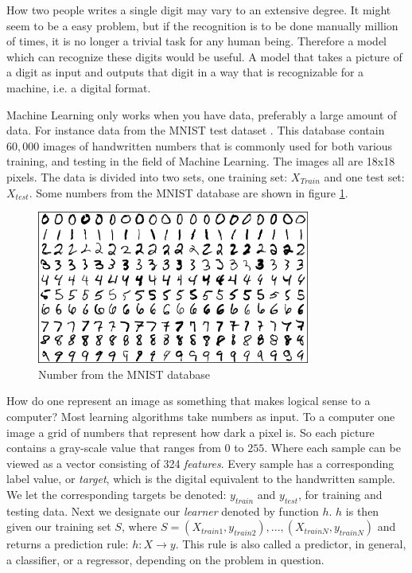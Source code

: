 	How two people writes a single digit may vary to an extensive degree. It might seem to be a easy problem, but if the recognition is to be done manually million of times, it is no longer a trivial task for any human being. Therefore a model which can recognize these digits would be useful. A model that takes a picture of a digit as input and outputs that digit in a way that is recognizable for a machine, i.e. a digital format.
	
	Machine Learning only works when you have data, preferably a large amount of data. For instance data from the MNIST test dataset \cite{lecun1998gradient}. This database contain $60,000$ images of handwritten numbers that is commonly used for both various training, and testing in the field of Machine Learning. The images all are 18x18 pixels. The data is divided into two sets, one training set: $X_{Train}$ and one test set: $X_{test}$. Some numbers from the MNIST database are shown in figure \ref{fig:MNIST}. 
	
\begin{figure}[ht]
    \centering
    \includegraphics[width=0.8\textwidth]{theory/figures/MNIST.png}
    \caption{Number from the MNIST database \cite{MNIST}}
    \label{fig:MNIST}
\end{figure}
	
	How do one represent an image as something that makes logical sense to a computer? Most learning algorithms take numbers as input. To a computer one image a grid of numbers that represent how dark a pixel is. So each picture contains a gray-scale value that ranges from $0$ to $255$. Where each sample can be viewed as a vector consisting of 324 \textit{features}. Every sample has a corresponding label value, or \textit{target}, which is the digital equivalent to the handwritten sample. We let the corresponding targets be denoted: $y_{train}$ and $y_{test}$, for training and testing data. Next we designate our \textit{learner} denoted by function $h$. $h$ is then given our training set $S$, where $S = (X_{train1}, y_{train2}),..., (X_{trainN}, y_{trainN})$ and returns a prediction rule: $h: X \rightarrow y$. This rule is also called a predictor, in general, a classifier, or a regressor, depending on the problem in question. 
	
